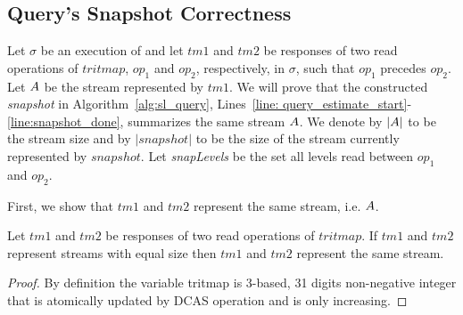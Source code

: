 
\subsection{Query's Snapshot Correctness} \label{ssec:query_proof}
Let $\sigma$ be an execution of \mysketch and let $tm1$ and $tm2$ be responses of two read operations of $tritmap$, $op_1$ and $op_2$, respectively, in $\sigma$, such that $op_1$ precedes $op_2$. Let $\mathnormal{A}$ be the stream represented by $tm1$. We will prove that the constructed \emph{snapshot} in Algorithm~\ref{alg:sl_query}, Lines~\ref{line: query_estimate_start}-\ref{line:snapshot_done}, summarizes the same stream $\mathnormal{A}$. We denote by $|\mathnormal{A}|$ to be the stream size and by $|snapshot|$ to be the size of the stream currently represented by $snapshot$.
Let \emph{snapLevels} be the set all levels read between $op_1$ and $op_2$.

First, we show that $tm1$ and $tm2$ represent the same stream, i.e.  $\mathnormal{A}$.

\begin{lemma}
Let $tm1$ and $tm2$ be responses of two read operations of $tritmap$.
If $tm1$ and $tm2$ represent streams with equal size then $tm1$ and $tm2$ represent the same stream.
\end{lemma}
\begin{proof}
By definition the variable tritmap is 3-based, 31 digits non-negative integer that is atomically updated by DCAS operation and is only increasing.   
\end{proof}

